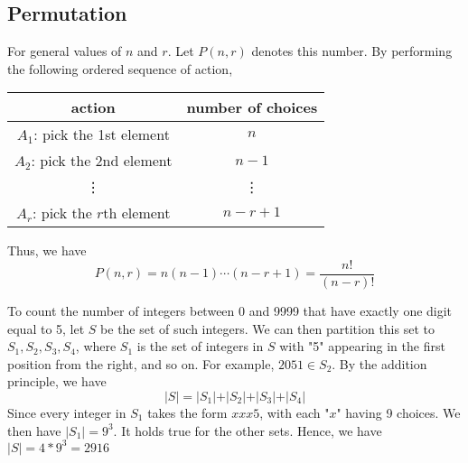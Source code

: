 \subsection{Permutation}
For general values of \(n\) and \(r\). Let \(P(n, r)\) denotes this number. By performing the following ordered sequence of action,
\begin{table}[H]
    \centering
    \begin{tabular}{c|c}
            action & number of choices  \\
        \midrule
            \(A_1\): pick the 1st element & \(n\)   \\
            \(A_2\): pick the 2nd element & \(n - 1\)   \\
            \vdots & \vdots  \\
            \(A_r\): pick the \(r\)th element & \(n - r + 1\)
    \end{tabular}
\end{table}
Thus, we have
\[
    P(n, r) = n(n - 1)\cdots(n - r + 1) = \dfrac{n!}{(n - r)!}
\]

\begin{eg}
    To count the number of integers between 0 and 9999 that have exactly one digit equal to 5, let \(S\) be the set of such integers. We can then partition this set to \(S_1, S_2, S_3, S_4\),  where \(S_1\) is the set of integers in \(S\) with "5" appearing in the first position from the right, and so on. For example, \(2051 \in S_2\). By the addition principle, we have
    \[
        \vert S \vert = \vert S_1 \vert + \vert S_2 \vert + \vert S_3 \vert + \vert S_4 \vert 
    \]
    Since every integer in \(S_1\) takes the form \(xxx5\), with each "\(x\)" having 9 choices. We then have \(\vert S_1 \vert = 9^3\). It holds true for the other sets. Hence, we have \(\vert S \vert = 4 * 9^3 = 2916\)
\end{eg}

